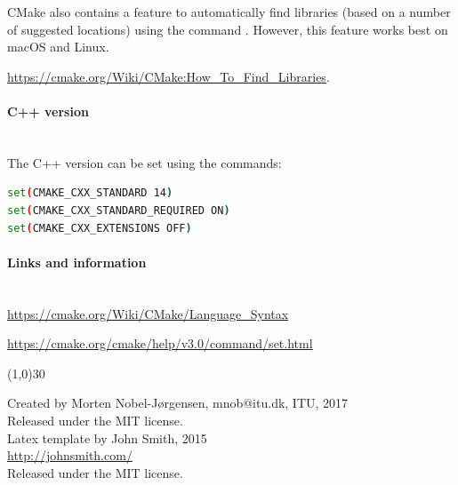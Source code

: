 \documentclass[11pt,a4paper,landscape]{scrartcl} %
\newcommand{\sectiontitle}[1]{\paragraph{#1} \ \\} %
\begin{document}
\begin{multicols}{2}
CMake also contains a feature to automatically find libraries (based on a number of suggested locations) using the command . However, this feature works best on macOS and Linux. 

\url{https://cmake.org/Wiki/CMake:How_To_Find_Libraries}.

\sectiontitle{C++ version}

The C++ version can be set using the commands:

\begin{lstlisting}[language=bash]
set(CMAKE_CXX_STANDARD 14)
set(CMAKE_CXX_STANDARD_REQUIRED ON)
set(CMAKE_CXX_EXTENSIONS OFF)
\end{lstlisting}


\vspace{\baselineskip} %


\sectiontitle{Links and information}

\url{https://cmake.org/Wiki/CMake/Language_Syntax}

\url{https://cmake.org/cmake/help/v3.0/command/set.html}


\vspace{\baselineskip}
\linethickness{0.5mm} %
{\color{mygray}\line(1,0){30}} %

\footnotesize{
Created by Morten Nobel-Jørgensen, mnob@itu.dk, ITU, 2017\\ 

Released under the MIT license. \\

Latex template by John Smith, 2015\\ 
\url{http://johnsmith.com/}\\
				
Released under the MIT license.
}

\end{multicols}

\end{document}
